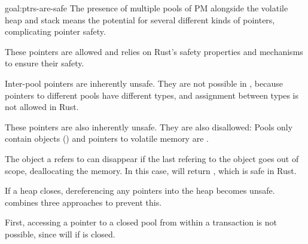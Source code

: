 \begin{goaltrue}{goal:ptrs-are-safe}
The presence of multiple pools of PM alongside the volatile heap and stack
means the potential for several different kinds of pointers, complicating 
pointer safety.

 These pointers are allowed and \this{}
relies on Rust's safety properties and mechanisms to ensure their safety.

 Inter-pool pointers are inherently
unsafe.  They are not possible in \this{}, because pointers to different
pools have different types, and assignment between types is not allowed in Rust.


 These pointers are
also inherently unsafe.  They are also disallowed: Pools only contain
 objects () and pointers to
volatile memory are .

 The object a
 refers to can disappear if the last  refering to the
object goes out of scope, deallocating the memory. In this case,
 will return , which is safe in Rust.

 If a heap closes, dereferencing any
pointers into the heap becomes unsafe.  \This{} combines three approaches to
prevent this.

First, accessing a pointer to a closed pool from within a transaction is not
possible, since  will  if  is
closed.


\end{goaltrue}
